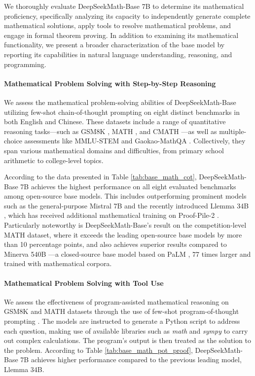 \begin{itemize}[topsep=0pt]
We thoroughly evaluate DeepSeekMath-Base 7B to determine its mathematical proficiency, specifically analyzing its capacity to independently generate complete mathematical solutions, apply tools to resolve mathematical problems, and engage in formal theorem proving. In addition to examining its mathematical functionality, we present a broader characterization of the base model by reporting its capabilities in natural language understanding, reasoning, and programming.

\paragraph{Mathematical Problem Solving with Step-by-Step Reasoning}

We assess the mathematical problem-solving abilities of DeepSeekMath-Base utilizing few-shot chain-of-thought prompting \citep{cot} on eight distinct benchmarks in both English and Chinese. These datasets include a range of quantitative reasoning tasks—such as GSM8K \citep{gsm8k}, MATH \citep{MATH}, and CMATH \citep{wei2023cmath}—as well as multiple-choice assessments like MMLU-STEM \citep{mmlu} and Gaokao-MathQA \citep{agieval}. Collectively, they span various mathematical domains and difficulties, from primary school arithmetic to college-level topics.

According to the data presented in Table \ref{tab:base_math_cot}, DeepSeekMath-Base 7B achieves the highest performance on all eight evaluated benchmarks among open-source base models. This includes outperforming prominent models such as the general-purpose Mistral 7B \citep{mistral} and the recently introduced Llemma 34B \citep{llemma}, which has received additional mathematical training on Proof-Pile-2 \citep{llemma}. Particularly noteworthy is DeepSeekMath-Base’s result on the competition-level MATH dataset, where it exceeds the leading open-source base models by more than 10 percentage points, and also achieves superior results compared to Minerva 540B \citep{minerva}—a closed-source base model based on PaLM \citep{palm}, 77 times larger and trained with mathematical corpora.

\paragraph{Mathematical Problem Solving with Tool Use} We assess the effectiveness of program-assisted mathematical reasoning on GSM8K and MATH datasets through the use of few-shot program-of-thought prompting \citep{pot,pal}. The models are instructed to generate a Python script to address each question, making use of available libraries such as \textit{math} and \textit{sympy} to carry out complex calculations. The program's output is then treated as the solution to the problem. According to Table \ref{tab:base_math_pot_proof}, DeepSeekMath-Base 7B achieves higher performance compared to the previous leading model, Llemma 34B.


\end{itemize}
